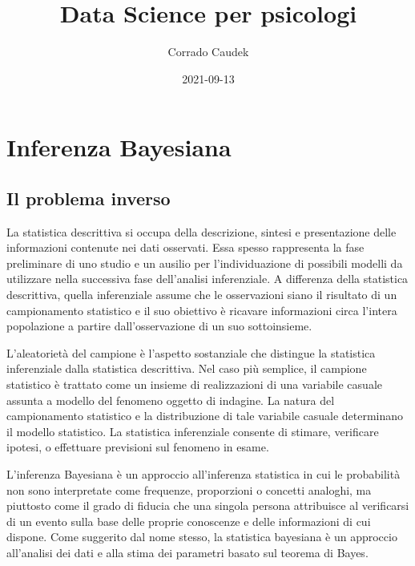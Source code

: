 \documentclass[
]{memoir}
\title{Data Science per psicologi}
\author{Corrado Caudek}
\date{2021-09-13}
\theoremstyle{definition}
\theoremstyle{definition}
\theoremstyle{definition}
\theoremstyle{definition}
\theoremstyle{remark}
\begin{document}
\maketitle

{
\hypersetup{linkcolor=}
\setcounter{tocdepth}{1}
\tableofcontents
}
\newpage

\vspace*{5cm}

\thispagestyle{empty}

\hypertarget{part-inferenza-bayesiana}{%
\part*{Inferenza Bayesiana}\label{part-inferenza-bayesiana}}

\hypertarget{chapter-intro-bayes-inference}{%
\chapter{Il problema inverso}\label{chapter-intro-bayes-inference}}

La statistica descrittiva si occupa della descrizione, sintesi e presentazione delle informazioni contenute nei dati osservati. Essa spesso rappresenta la fase preliminare di uno studio e un ausilio per l'individuazione di possibili modelli da utilizzare nella successiva fase dell'analisi inferenziale. A differenza della statistica descrittiva, quella inferenziale assume che le osservazioni siano il risultato di un campionamento statistico e il suo obiettivo è ricavare informazioni circa l'intera popolazione a partire dall'osservazione di un suo sottoinsieme.

L'aleatorietà del campione è l'aspetto sostanziale che distingue la statistica inferenziale dalla statistica descrittiva. Nel caso più semplice, il campione statistico è trattato come un insieme di realizzazioni di una variabile casuale assunta a modello del fenomeno oggetto di indagine. La natura del campionamento statistico e la distribuzione di tale variabile casuale determinano il modello statistico. La statistica inferenziale consente di stimare, verificare ipotesi, o effettuare previsioni sul fenomeno in esame.

L'inferenza Bayesiana è un approccio all'inferenza statistica in cui le probabilità non sono interpretate come frequenze, proporzioni o concetti analoghi, ma piuttosto come il grado di fiducia che una singola persona attribuisce al verificarsi di un evento sulla base delle proprie conoscenze e delle informazioni di cui dispone. Come suggerito dal nome stesso, la statistica bayesiana è un approccio all'analisi dei dati e alla stima dei parametri basato sul teorema di Bayes.
\end{document}
